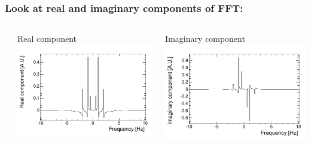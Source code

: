 \documentclass[bigger]{beamer}
\begin{document}
\begin{frame}
\frametitle{Look at real and imaginary components of FFT:}
\label{sec-2-1-4}
\begin{columns} %
\label{sec-2-1-4-1}
\begin{column}{0.55\textwidth}
\label{sec-2-1-4-1-1}

\centering
Real component
\includegraphics[width=\textwidth]{fig/tutorial_FFT_real.png}
\end{column}
\begin{column}{0.55\textwidth}
\label{sec-2-1-4-1-2}

\centering
Imaginary component
\includegraphics[width=\textwidth]{fig/tutorial_FFT_imag.png}
\end{column}
\end{columns}
\begin{itemize}


\end{itemize}
\end{frame}
\end{document}
